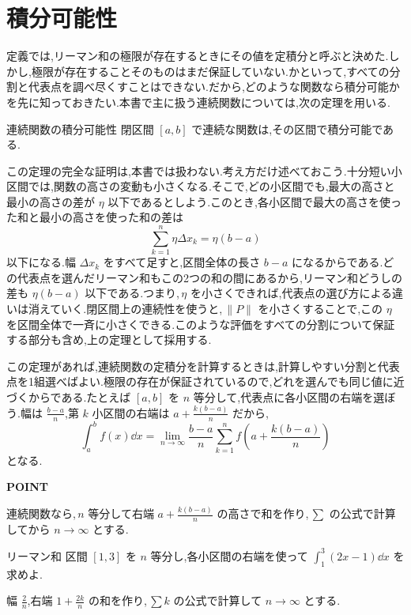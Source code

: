 \section{積分可能性}\label{節:積分可能性}
定義では,リーマン和の極限が存在するときにその値を定積分と呼ぶと決めた.しかし,極限が存在することそのものはまだ保証していない.かといって,すべての分割と代表点を調べ尽くすことはできない.だから,どのような関数なら積分可能かを先に知っておきたい.本書で主に扱う連続関数については,次の定理を用いる.

\begin{theorem}{連続関数の積分可能性}\label{定理:連続積分可能}
閉区間 $[a,b]$ で連続な関数は,その区間で積分可能である.
\end{theorem}

この定理の完全な証明は,本書では扱わない.考え方だけ述べておこう.十分短い小区間では,関数の高さの変動も小さくなる.そこで,どの小区間でも,最大の高さと最小の高さの差が $\eta$ 以下であるとしよう.このとき,各小区間で最大の高さを使った和と最小の高さを使った和の差は
\[
 \sum_{k=1}^{n}\eta\Delta x_k=\eta(b-a)
\]
以下になる.幅 $\Delta x_k$ をすべて足すと,区間全体の長さ $b-a$ になるからである.どの代表点を選んだリーマン和もこの2つの和の間にあるから,リーマン和どうしの差も $\eta(b-a)$ 以下である.つまり,\,$\eta$ を小さくできれば,代表点の選び方による違いは消えていく.閉区間上の連続性を使うと,\,$\|P\|$ を小さくすることで,この $\eta$ を区間全体で一斉に小さくできる.このような評価をすべての分割について保証する部分も含め,上の定理として採用する.

この定理があれば,連続関数の定積分を計算するときは,計算しやすい分割と代表点を1組選べばよい.極限の存在が保証されているので,どれを選んでも同じ値に近づくからである.たとえば $[a,b]$ を $n$ 等分して,代表点に各小区間の右端を選ぼう.幅は $\frac{b-a}{n}$,第 $k$ 小区間の右端は $a+\frac{k(b-a)}n$ だから,
\[
 \int_a^b f(x)\dd x
 =\lim_{n\to\infty}\frac{b-a}{n}
  \sum_{k=1}^{n}f\left(a+\frac{k(b-a)}n\right)
\]
となる.

\begin{bookpoint}
\textbf{POINT}\par
連続関数なら,\,$n$ 等分して右端 $a+\frac{k(b-a)}n$ の高さで和を作り,\,$\sum$ の公式で計算してから $n\to\infty$ とする.
\end{bookpoint}

\begin{example}{リーマン和}
区間 $[1,3]$ を $n$ 等分し,各小区間の右端を使って $\int_1^3(2x-1)\dd x$ を求めよ.
\end{example}
幅 $\frac2n$,右端 $1+\frac{2k}n$ の和を作り,\,$\sum k$ の公式で計算して $n\to\infty$ とする.

